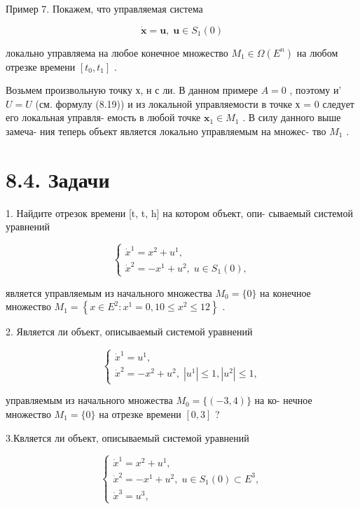 \documentclass[8pt]{extarticle}
\begin{document}
Пример 7. Покажем, что управляемая система

\[
\dot{\mathbf{x}} = \mathbf{u},\;\mathbf{u} \in  {S}_{1}\left( 0\right)
\]

локально управляема на любое конечное множество \({M}_{1} \in  \Omega \left( {E}^{n}\right)\) на любом отрезке времени \(\left\lbrack  {{t}_{0},{t}_{1}}\right\rbrack\) .

Возьмем произвольную точку х, н с ли. В данном примере \(A = 0\) , поэтому и’ \(U = U\) (см. формулу (8.19)) и из локальной управляемости в точке х = 0 следует его локальная управля- емость в любой точке \({\mathbf{x}}_{1} \in  {M}_{1}\) . В силу данного выше замеча- ния теперь объект является локально управляемым на множес- тво \({M}_{1}\) .

\section*{8.4. Задачи}

1. Найдите отрезок времени [t, t, h] на котором объект, опи- сываемый системой уравнений

\[
\left\{  \begin{array}{l} {\dot{x}}^{1} = {x}^{2} + {u}^{1}, \\  {\dot{x}}^{2} =  - {x}^{1} + {u}^{2},\;u \in  {S}_{1}\left( 0\right) , \end{array}\right.
\]

является управляемым из начального множества \({M}_{0} = \{ 0\}\) на конечное множество \({M}_{1} = \left\{  {x \in  {E}^{2} : {x}^{1} = 0,{10} \leq  {x}^{2} \leq  {12}}\right\}\) .

2. Является ли объект, описываемый системой уравнений

\[
\left\{  \begin{array}{l} {\dot{x}}^{1} = {u}^{1}, \\  {\dot{x}}^{2} =  - {x}^{2} + {u}^{2},\;\left| {u}^{1}\right|  \leq  1,\left| {u}^{2}\right|  \leq  1, \end{array}\right.
\]

управляемым из начального множества \({M}_{0} = \{ \left( {-3,4}\right) \}\) на ко- нечное множество \({M}_{1} = \{ 0\}\) на отрезке времени \(\left\lbrack  {0,3}\right\rbrack\) ?

3.Квляется ли объект, описываемый системой уравнений

\[
\left\{  \begin{array}{l} {\dot{x}}^{1} = {x}^{2} + {u}^{1}, \\  {\dot{x}}^{2} =  - {x}^{1} + {u}^{2},\;u \in  {S}_{1}\left( 0\right)  \subset  {E}^{3}, \\  {\dot{x}}^{3} = {u}^{3}, \end{array}\right.
\]
\end{document}
